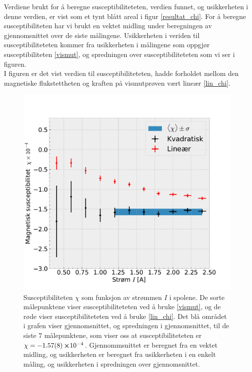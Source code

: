 \documentclass[%
 reprint,
 amsmath,amssymb,
 aps,
 norsk,
]{revtex4-1}
\begin{document}
Verdiene brukt for å beregne susceptibiliteteten, verdien funnet, og usikkerheten i denne verdien, er vist som et tynt blått areal i figur \vref{resultat_chi}. For å beregne susceptibiliteten har vi brukt en vektet midling under beregningen av gjennomsnittet over de siste målingene. Usikkerheten i veriden til susceptibiliteteten kommer fra usikkerheten i målingene som oppgjør susceptibiliteten \eqref{vismut}, og spredningen over susceptibiliteteten som vi ser i figuren.\\
I figuren er det vist verdien til susceptibiliteteten, hadde forholdet mellom den magnetiske flukstettheten og kraften på vismutprøven vært lineær \eqref{lin_chi}.
\begin{figure}[h!]
  \centering
  \includegraphics[scale=0.45]{chi_effekt.pdf}
  \caption{Susceptibiliteten $\chi$ som funksjon av strømmen $I$ i spolene. De sorte målepunktene viser susceptibiliteteten ved å bruke \eqref{vismut}, og de røde viser susceptibiliteteten ved å bruke \eqref{lin_chi}. Det blå området i grafen viser gjennomsnittet, og spredningen i gjennomsnittet, til de siste $7$ målepunktene, som viser oss at susceptibiliteteten er $\chi = -\SI{1.57\pm0.08}\cross 10^{-4}$. Gjennommsnittet er beregnet fra en vektet midling, og usikkerheten er beregnet fra usikkerheten i en enkelt måling, og usikkerheten i spredningen over gjennomsnittet.}
  \label{resultat_chi}
\end{figure}
\end{document}
